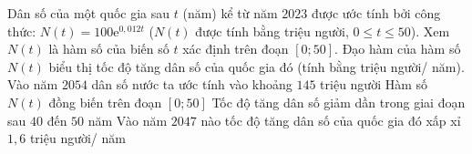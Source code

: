 \begin{ex}%

Dân số của một quốc gia sau $t$ (năm) kể từ năm $2023$ được ước tính bởi công thức: $N(t)=100 \mathrm{e}^{0{,}012 t}$ (${N}({t})$ được tính bằng triệu người, $0 \leq t \leq 50$). Xem ${N}({t})$ là hàm số của biến số $t$ xác định trên đoạn $[0 ; 50]$. Đạo hàm của hàm số ${N}({t})$ biểu thị tốc độ tăng dân số của quốc gia đó (tính bằng triệu người/ năm).
\choiceTF
{\True Vào năm $2054$ dân số nước ta ước tính vào khoảng $145$ triệu người}
{\True Hàm số $N(t)$ đồng biến trên đoạn $[0 ; 50]$}
{Tốc độ tăng dân số giảm dần trong giai đoạn sau $40$ đến $50$ năm}
{\True Vào năm $2047$ nào tốc độ tăng dân số của quốc gia đó xấp xỉ $1{,}6$ triệu người/ năm}

\end{ex}

